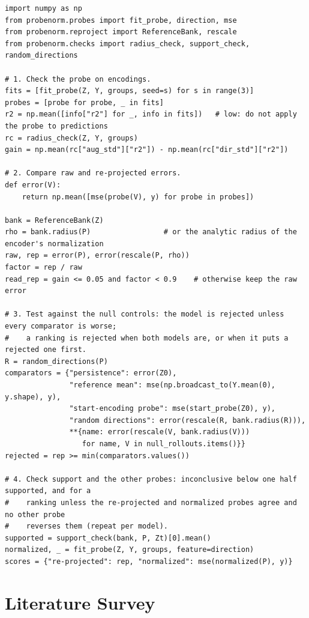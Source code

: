 \begin{tcolorbox}[breakable,colback=codebg,colframe=codebg,boxrule=0pt,arc=2pt,left=4pt,right=4pt,top=4pt,bottom=4pt]
\begin{lstlisting}
import numpy as np
from probenorm.probes import fit_probe, direction, mse
from probenorm.reproject import ReferenceBank, rescale
from probenorm.checks import radius_check, support_check, random_directions

# 1. Check the probe on encodings.
fits = [fit_probe(Z, Y, groups, seed=s) for s in range(3)]
probes = [probe for probe, _ in fits]
r2 = np.mean([info["r2"] for _, info in fits])   # low: do not apply the probe to predictions
rc = radius_check(Z, Y, groups)
gain = np.mean(rc["aug_std"]["r2"]) - np.mean(rc["dir_std"]["r2"])

# 2. Compare raw and re-projected errors.
def error(V):
    return np.mean([mse(probe(V), y) for probe in probes])

bank = ReferenceBank(Z)
rho = bank.radius(P)                 # or the analytic radius of the encoder's normalization
raw, rep = error(P), error(rescale(P, rho))
factor = rep / raw
read_rep = gain <= 0.05 and factor < 0.9    # otherwise keep the raw error

# 3. Test against the null controls: the model is rejected unless every comparator is worse;
#    a ranking is rejected when both models are, or when it puts a rejected one first.
R = random_directions(P)
comparators = {"persistence": error(Z0),
               "reference mean": mse(np.broadcast_to(Y.mean(0), y.shape), y),
               "start-encoding probe": mse(start_probe(Z0), y),
               "random directions": error(rescale(R, bank.radius(R))),
               **{name: error(rescale(V, bank.radius(V)))
                  for name, V in null_rollouts.items()}}
rejected = rep >= min(comparators.values())

# 4. Check support and the other probes: inconclusive below one half supported, and for a
#    ranking unless the re-projected and normalized probes agree and no other probe
#    reverses them (repeat per model).
supported = support_check(bank, P, Zt)[0].mean()
normalized, _ = fit_probe(Z, Y, groups, feature=direction)
scores = {"re-projected": rep, "normalized": mse(normalized(P), y)}
\end{lstlisting}
\end{tcolorbox}

\section{Literature Survey}
\label{app:literature}

